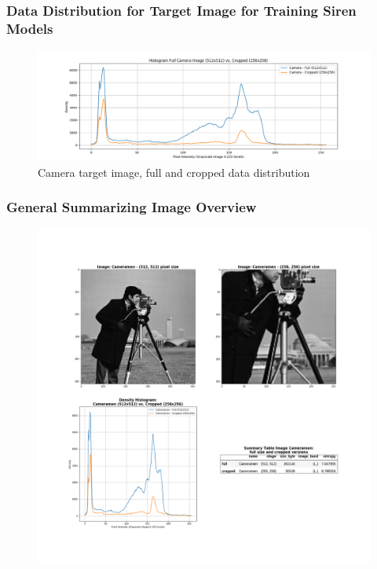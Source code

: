 \begin{frame}
    \frametitle{Data Distribution for Target Image for Training Siren Models}
        \begin{figure}
        \includegraphics[scale=0.2]{slides/experiments/target-image/images/mixing_image_hist.png}
        \caption{Camera target image, full and cropped data distribution}
        \end{figure}
\end{frame}


\begin{frame}
    \frametitle{General Summarizing Image Overview}
        \begin{figure}
        \includegraphics[scale=0.15]{slides/experiments/target-image/images/complex_3.png}
        \end{figure}
\end{frame}
